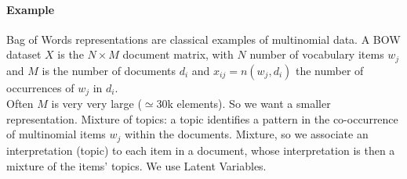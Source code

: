 \documentclass[10pt]{report}
\begin{document}
\paragraph{Example} Bag of Words representations are classical examples of multinomial data. A BOW dataset $X$ is the $N\times M$ document matrix, with $N$ number of vocabulary items $w_j$ and $M$ is the number of documents $d_i$ and $x_{ij} = n(w_j,d_i)$ the number of occurrences of $w_j$ in $d_i$.\\
Often $M$ is very very large ($\simeq 30$k elements). So we want a smaller representation. Mixture of topics: a topic identifies a pattern in the co-occurrence of multinomial items $w_j$ within the documents. Mixture, so we associate an interpretation (topic) to each item in a document, whose interpretation is then a mixture of the items' topics. We use Latent Variables.
\end{document}
